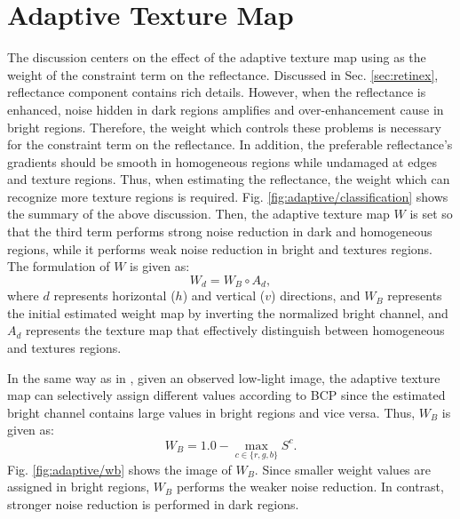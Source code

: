 \section{Adaptive Texture Map} \label{sec:adaptive}
The discussion centers on the effect of the adaptive texture map using as the weight of the constraint term on the reflectance. Discussed in Sec. \ref{sec:retinex}, reflectance component contains rich details. However, when the reflectance is enhanced, noise hidden in dark regions amplifies and over-enhancement cause in bright regions. Therefore, the weight which controls these problems is necessary for the constraint term on the reflectance. In addition, the preferable reflectance's gradients should be smooth in homogeneous regions while undamaged at edges and texture regions. Thus, when estimating the reflectance, the weight which can recognize more texture regions is required. Fig. \ref{fig:adaptive/classification} shows the summary of the above discussion.
Then, the adaptive texture map $W$ is set so that the third term performs strong noise reduction in dark and homogeneous regions, while it performs weak noise reduction in bright and textures regions. 
The formulation of $W$ is given as:
\begin{equation}
W_{d} = W_{B} \circ A_{d}, \label{eq: adaptive_texture}
\end{equation}
where $d$ represents horizontal ($h$) and vertical ($v$) directions, and $W_{B}$ represents the initial estimated weight map by inverting the normalized bright channel, and $A_{d}$ represents the texture map that effectively distinguish between homogeneous and textures regions.\par
In the same way as in \cite{activation}, given an observed low-light image, the adaptive texture map can selectively assign different values according to BCP since the estimated bright channel contains large values in bright regions and vice versa. 
Thus, $W_{B}$ is given as:
\begin{equation}
W_{B} = 1.0 - \max_{c \in \{r, g, b\}}S^{c}. \label{eq: initial_weight}
\end{equation}
Fig. \ref{fig:adaptive/wb} shows the image of $W_{B}$. Since smaller weight values are assigned in bright regions, $W_{B}$ performs the weaker noise reduction. In contrast, stronger noise reduction is performed in dark regions.\par
 
